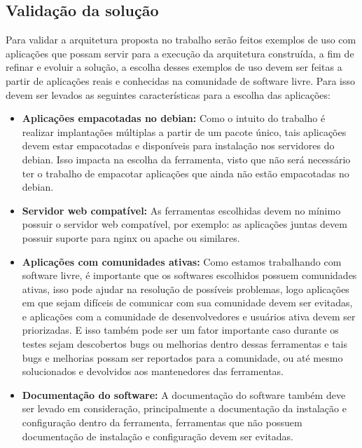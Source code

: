\subsection{Validação da solução}
\label{subsection:validacao}

Para validar a arquitetura proposta no trabalho serão feitos exemplos de uso
com aplicações que possam servir para a execução da arquitetura construída, a
fim de refinar e evoluir a solução, a escolha desses exemplos de uso devem ser
feitas a partir de aplicações reais e conhecidas na comunidade de software livre.
 Para isso devem ser levados as seguintes características para a escolha das aplicações:

\begin{itemize}
  \item  \textbf{Aplicações empacotadas no debian:}  Como o intuito do trabalho
  é realizar implantações múltiplas a partir de um pacote único, tais aplicações
  devem estar empacotadas e disponíveis para instalação nos servidores do debian.
  Isso impacta na escolha da ferramenta, visto que não será necessário ter o trabalho
  de empacotar aplicações que ainda não estão empacotadas no debian.
  \item  \textbf{Servidor web compatível:} As ferramentas escolhidas devem no
  mínimo possuir o servidor web compatível, por exemplo: as aplicações juntas
  devem possuir suporte para nginx ou apache ou similares.
  \item  \textbf{Aplicações com comunidades ativas:} Como estamos trabalhando
  com software livre, é importante que os softwares escolhidos possuem comunidades
  ativas, isso pode ajudar na resolução de  possíveis problemas, logo aplicações
  em que sejam difíceis de comunicar com sua comunidade devem ser evitadas, e
  aplicações com a comunidade de desenvolvedores e usuários ativa devem ser priorizadas.
  E isso também pode ser um fator importante caso durante os testes sejam descobertos
  bugs ou melhorias dentro dessas ferramentas e tais bugs e melhorias possam ser
  reportados para a comunidade, ou até mesmo solucionados e devolvidos aos mantenedores
  das ferramentas.
  \item  \textbf{Documentação do software:} A documentação do software também deve
  ser levado em consideração, principalmente a documentação da instalação e configuração
  dentro da ferramenta, ferramentas que não possuem documentação de instalação e
  configuração devem ser evitadas.
\end{itemize}

